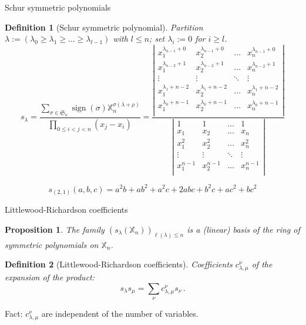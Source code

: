 \documentclass{beamer}
\newcommand{\XX}{{\mathbb X}}
\newcommand{\SG}{{\mathfrak S}}
\newtheorem{DEFN}{Definition}
\newtheorem{PROP}{Proposition}
\begin{document}
\begin{frame}{Schur symmetric polynomials}

  \begin{DEFN}[Schur symmetric polynomial]
    \small Partition $\lambda := (\lambda_0\geq\lambda_1\geq\dots\geq\lambda_{l-1})$ with $l\leq
    n$; set $\lambda_i:=0$ for $i\geq l$.\\

    \[
    s_{\lambda} =
    \frac{\sum_{\sigma\in\SG_n} \operatorname{sign}(\sigma)
      \XX_n^{\sigma(\lambda+\rho)}}%
    {\prod_{0\leq i<j<n} (x_j - x_i)}
    = \frac{\left|
       \begin{smallmatrix}
         x_1^{\lambda_{n-1}+0}  & x_2^{\lambda_{n-1}+0}   & \dots  & x_n^{\lambda_{n-1}+0}  \\
         x_1^{\lambda_{n-2}+1}  & x_2^{\lambda_{n-2}+1}   & \dots  & x_n^{\lambda_{n-2}+1}  \\
         \vdots & \vdots & \ddots & \vdots \\
         x_1^{\lambda_1+n-2}  & x_2^{\lambda_1+n-2}   & \dots  & x_n^{\lambda_1+n-2}  \\
         x_1^{\lambda_0+n-1}  & x_2^{\lambda_0+n-1}   & \dots  & x_n^{\lambda_0+n-1}  \\
      \end{smallmatrix}
      \right|
    }{\left|
       \begin{smallmatrix}
         1      & 1      & \dots  & 1     \\
         x_1    & x_2    & \dots  & x_n    \\
         x_1^2  & x_2^2   & \dots  & x_n^2  \\
         \vdots & \vdots & \ddots & \vdots \\
         x_1^{n-1}  & x_2^{n-1}   & \dots  & x_n^{n-1}  \\
      \end{smallmatrix}
      \right|
    }
    \]
  \end{DEFN}
  \[s_{(2,1)}(a,b,c) = a^2b + ab^2 + a^2c + 2abc + b^2c + ac^2 + bc^2\]
\end{frame}


\begin{frame}{Littlewood-Richardson coefficients}

  \begin{PROP}
    The family $(s_\lambda(\XX_n))_{\ell(\lambda) \leq n}$ is a (linear) basis of the
    ring of symmetric polynomials on $\XX_n$.
  \end{PROP}

  \begin{DEFN}[Littlewood-Richardson coefficients]
    Coefficients $c_{\lambda,\mu}^\nu$ of the expansion of the product:
    \[
    s_\lambda s_\mu = \sum_{\nu} c_{\lambda,\mu}^\nu s_\nu\,.
    \]
  \end{DEFN}

  \bigskip
  Fact: $c_{\lambda,\mu}^\nu$ are independent of the number of variables.
\end{frame}
\end{document}
